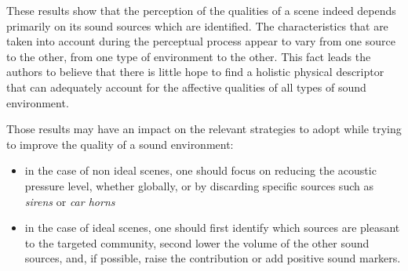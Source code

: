 \documentclass[12pt]{elsarticle}
\newcommand{\ie}{\emph{i.\,e.}}
\begin{document}

These results show that the perception of the qualities of a scene indeed depends primarily on its sound sources which are identified. The characteristics that are taken into account during the perceptual process appear to vary from one source to the other, from one type of environment to the other. This fact leads the authors to believe that there is little hope to find a holistic physical descriptor that can adequately account for the affective qualities of all types of sound environment.


Those results may have an impact on the relevant strategies to adopt while trying to improve the quality of a sound environment:


\begin{itemize}
\item in the case of non ideal scenes, one should focus on reducing the acoustic pressure level, whether globally, or by discarding specific sources such as \emph{sirens} or \emph{car horns}
\item in the case of ideal scenes, one should first identify which sources are pleasant to the targeted community, second lower the volume of the other sound sources, and, if possible, raise the contribution or add positive sound markers.
\end{itemize}
\end{document}

